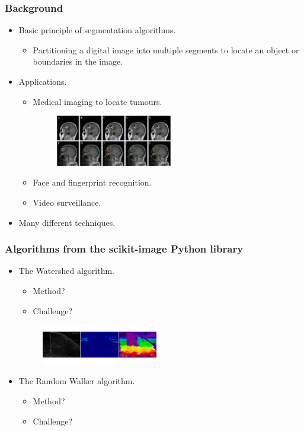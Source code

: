 \documentclass{beamer}
\begin{document}
\begin{frame}
\frametitle{Background}
\begin{itemize}
\item Basic principle of segmentation algorithms.
\begin{itemize}
\item Partitioning a digital image into multiple segments to locate an object or boundaries in the image.
\end{itemize}
\item Applications.
\begin{itemize}
\item Medical imaging to locate tumours.
\begin{figure}
 \centering
 \includegraphics[width=2in]{braintumor.jpg}
 \caption{}
 \end{figure}
\item Face and fingerprint recognition.
\item Video surveillance.
\end{itemize}
\item Many different techniques.
\end{itemize}
\end{frame}

\begin{frame}
\frametitle{Algorithms from the scikit-image Python library}
\begin{itemize}
\item The Watershed\cite{scikit-image} algorithm.
\begin{itemize}
\item Method?
\item Challenge?
\end{itemize}
\begin{figure}
 \centering
 \includegraphics[width=2in]{watershed.png}
 \caption{}
 \end{figure}

\item The Random Walker\cite{scikit-image} algorithm.
\begin{itemize}
\item Method?
\item Challenge?
\end{itemize}
\end{itemize}
\end{frame}
\end{document}
